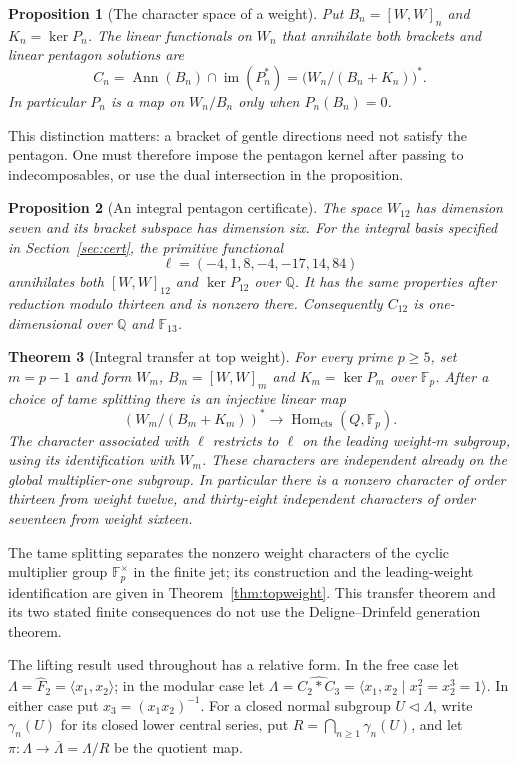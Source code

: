 \documentclass[11pt]{article}
\newcommand{\F}{\mathbb F}
\newcommand{\Q}{\mathbb Q}
\newcommand{\Hom}{\operatorname{Hom}}
\newcommand{\Ann}{\operatorname{Ann}}
\newcommand{\im}{\operatorname{im}}
\newcommand{\cts}{\mathrm{cts}}
\newtheorem{theorem}{Theorem}[section]
\newtheorem{proposition}[theorem]{Proposition}
\theoremstyle{definition}
\theoremstyle{remark}
\begin{document}
\begin{proposition}[The character space of a weight]\label{prop:dual}
Put $B_n=[W,W]_n$ and $K_n=\ker P_n$.  The linear functionals on $W_n$
that annihilate both brackets and linear pentagon solutions are
\[
 C_n=\Ann(B_n)\cap\im(P_n^*)
     =\bigl(W_n/(B_n+K_n)\bigr)^*.
\]
In particular $P_n$ is a map on $W_n/B_n$ only when $P_n(B_n)=0$.
\end{proposition}

This distinction matters: a bracket of gentle directions need not satisfy
the pentagon.  One must therefore impose the pentagon kernel after passing
to indecomposables, or use the dual intersection in the proposition.

\begin{proposition}[An integral pentagon certificate]\label{prop:weight12}
The space $W_{12}$ has dimension seven and its bracket subspace has
dimension six.  For the integral basis specified in Section~\ref{sec:cert},
the primitive functional
\[
\ell=(-4,1,8,-4,-17,14,84)
\]
annihilates both $[W,W]_{12}$ and $\ker P_{12}$ over $\Q$.
It has the same properties after reduction modulo thirteen and is nonzero
there.  Consequently $C_{12}$ is one-dimensional over $\Q$ and $\F_{13}$.
\end{proposition}

\begin{theorem}[Integral transfer at top weight]\label{thm:main-topweight}
For every prime $p\geq5$, set $m=p-1$ and form $W_m$, $B_m=[W,W]_m$
and $K_m=\ker P_m$ over $\F_p$. After a choice of tame splitting there
is an injective linear map
\[
 (W_m/(B_m+K_m))^*
 \longrightarrow \Hom_{\cts}(Q,\F_p).
\]
The character associated with $\ell$ restricts to $\ell$ on the
leading weight-$m$ subgroup, using its identification with $W_m$.
These characters are independent already on the global multiplier-one
subgroup. In particular there is a nonzero character of order thirteen
from weight twelve, and thirty-eight independent characters of order
seventeen from weight sixteen.
\end{theorem}

The tame splitting separates the nonzero weight characters of the
cyclic multiplier group $\F_p^\times$ in the finite jet; its construction
and the leading-weight identification are given in
Theorem~\ref{thm:topweight}. This transfer theorem and its two stated
finite consequences do not use the Deligne--Drinfeld generation theorem.

The lifting result used throughout has a relative form. In the free case
let $\Lambda=\widehat F_2=\langle x_1,x_2\rangle$; in the modular case
let $\Lambda=\widehat{C_2*C_3}=\langle x_1,x_2\mid x_1^2=x_2^3=1\rangle$.
In either case put $x_3=(x_1x_2)^{-1}$. For a closed normal subgroup
$U\triangleleft\Lambda$, write $\gamma_n(U)$ for its closed lower
central series, put $R=\bigcap_{n\geq1}\gamma_n(U)$, and let
$\pi:\Lambda\to\overline\Lambda=\Lambda/R$ be the quotient map.
\end{document}

